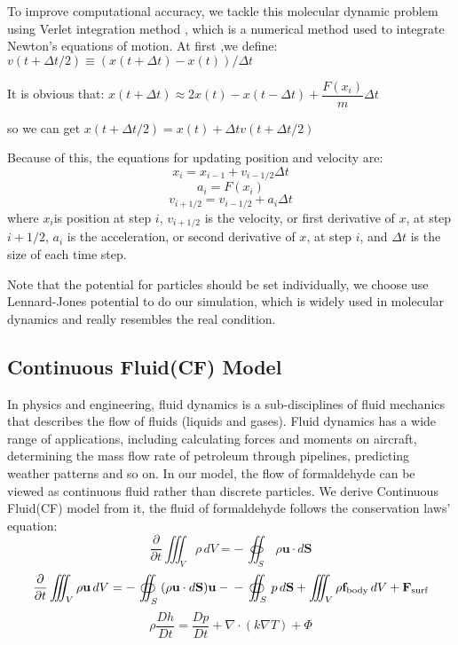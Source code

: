 \documentclass{mcmthesis}
\begin{document}
To improve computational accuracy, we tackle this molecular dynamic problem using Verlet integration method \cite{paterlini1998constant}, which is a numerical method used to integrate Newton's equations of motion.
At first ,we define:$v(t+\Delta t/2)\equiv (x(t+\Delta t)-x(t))/\Delta t$

It is obvious that:
$x(t+\Delta t)\approx 2x(t)-x(t-\Delta t)+\dfrac{F(x_i)}{m} \Delta t$

so we can get  $x(t+\Delta t/2)=x(t)+\Delta t v(t+\Delta t/2)$

Because of this, the equations for updating position and velocity are:
\begin{equation}
x_i=x_{i-1}+v_{i-1/2}\Delta t
\end{equation}
\begin{equation}
a_i=F(x_i)
\end{equation}
\begin{equation}
v_{i+1/2}=v_{i-1/2}+a_i \Delta t
\end{equation}
where $x_{i}$is position at step $i$, $v_{i+1/2}$ is the velocity, or first derivative of $x$, at step $i+1/2$, $a_{i}$ is the acceleration, or second derivative of $x$, at step $i$, and $\Delta t$ is the size of each time step. 

Note that the potential for particles should be set individually, we choose use Lennard-Jones potential\cite{lennard1931cohesion} to do our simulation, which is widely used in molecular dynamics and really resembles the real condition.

\subsection{Continuous Fluid(CF) Model}

In physics and engineering, fluid dynamics is a sub-disciplines of fluid mechanics that describes the flow of fluids (liquids and gases). Fluid dynamics has a wide range of applications, including calculating forces and moments on aircraft, determining the mass flow rate of petroleum through pipelines, predicting weather patterns and so on. In our model, the flow of formaldehyde can be viewed as continuous fluid rather than discrete particles. We derive Continuous Fluid(CF) model from it, the fluid of formaldehyde follows the conservation laws' equation:
\begin{equation}
\frac{\partial}{\partial t}\iiint _{V}\rho \,dV=-\,\oiint _S \,\rho\mathbf {u}\cdot d\mathbf{S}
\end{equation}
\begin{equation}
{\frac {\partial }{\partial t}}\iiint _{\scriptstyle V}\rho \mathbf {u} \,dV=-\,{} \oiint _{\displaystyle _{\scriptstyle S}} {\displaystyle (\rho \mathbf {u} \cdot d\mathbf {S} )\mathbf {u} -{}}-{} \oiint_{\displaystyle {\scriptstyle S}} \,p\,d\mathbf {S}  {\displaystyle \displaystyle {}+\iiint _{\scriptstyle V}\rho \mathbf {f} _{\text{body}}\,dV+\mathbf {F} _{\text{surf}}}
\end{equation}
\begin{equation}
\rho \frac{Dh}{Dt}=\frac{Dp}{Dt}+\nabla\cdot\left(k\nabla T\right)+\Phi 
\end{equation}
\end{document}
